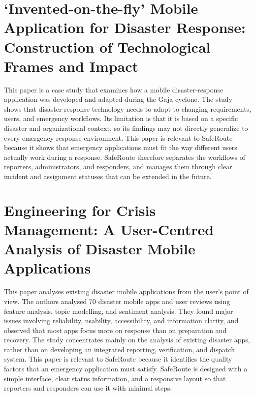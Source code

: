 \documentclass[a4paper,12pt]{report}
\begin{document}
	\vspace{0.5cm}
	\section{`Invented-on-the-fly' Mobile Application for Disaster Response: Construction of Technological Frames and Impact}
	
	\hspace{1cm}This paper is a case study that examines how a mobile disaster-response application was developed and adapted during the Gaja cyclone. The study shows that disaster-response technology needs to adapt to changing requirements, users, and emergency workflows. Its limitation is that it is based on a specific disaster and organizational context, so its findings may not directly generalize to every emergency-response environment. This paper is relevant to SafeRoute because it shows that emergency applications must fit the way different users actually work during a response. SafeRoute therefore separates the workflows of reporters, administrators, and responders, and manages them through clear incident and assignment statuses that can be extended in the future.~\cite{three}
	
	\vspace{0.5cm}
	\section{Engineering for Crisis Management: A User-Centred Analysis of Disaster Mobile Applications}
	
	\hspace{1cm}This paper analyses existing disaster mobile applications from the user's point of view. The authors analysed 70 disaster mobile apps and user reviews using feature analysis, topic modelling, and sentiment analysis. They found major issues involving reliability, usability, accessibility, and information clarity, and observed that most apps focus more on response than on preparation and recovery. The study concentrates mainly on the analysis of existing disaster apps, rather than on developing an integrated reporting, verification, and dispatch system. This paper is relevant to SafeRoute because it identifies the quality factors that an emergency application must satisfy. SafeRoute is designed with a simple interface, clear status information, and a responsive layout so that reporters and responders can use it with minimal steps.~\cite{four}
	
	\vspace{0.5cm}
\end{document}
